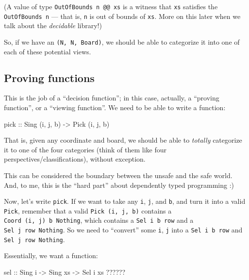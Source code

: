 \documentclass[]{article}
\newenvironment{Shaded}{}{}
\newcommand{\DataTypeTok}[1]{\textcolor[rgb]{0.56,0.13,0.00}{#1}}
\newcommand{\NormalTok}[1]{#1}
\newcommand{\OperatorTok}[1]{\textcolor[rgb]{0.40,0.40,0.40}{#1}}
\newcommand{\OtherTok}[1]{\textcolor[rgb]{0.00,0.44,0.13}{#1}}
\begin{document}
(A value of type \texttt{OutOfBounds\ n\ @@\ xs} is a witness that \texttt{xs}
satisfies the \texttt{OutOfBounds\ n} --- that is, \texttt{n} is out of bounds
of \texttt{xs}. More on this later when we talk about the \emph{decidable}
library!)

So, if we have an \texttt{(N,\ N,\ Board)}, we should be able to categorize it
into one of each of these potential views.

\hypertarget{proving-functions}{%
\subsection{Proving functions}\label{proving-functions}}

This is the job of a ``decision function''; in this case, actually, a ``proving
function'', or a ``viewing function''. We need to be able to write a function:

\begin{Shaded}
\begin{Highlighting}[]
\OtherTok{pick ::} \DataTypeTok{Sing}\NormalTok{ \textquotesingle{}(i, j, b)}
     \OtherTok{{-}>} \DataTypeTok{Pick}\NormalTok{ \textquotesingle{}(i, j, b)}
\end{Highlighting}
\end{Shaded}

That is, given any coordinate and board, we should be able to \emph{totally}
categorize it to one of the four categories (think of them like four
perspectives/classifications), without exception.

This can be considered the boundary between the unsafe and the safe world. And,
to me, this is the ``hard part'' about dependently typed programming :)

Now, let's write \texttt{pick}. If we want to take any \texttt{i}, \texttt{j},
and \texttt{b}, and turn it into a valid \texttt{Pick}, remember that a valid
\texttt{Pick\ \textquotesingle{}(i,\ j,\ b)} contains a
\texttt{Coord\ \textquotesingle{}(i,\ j)\ b\ \textquotesingle{}Nothing}, which
contains a \texttt{Sel\ i\ b\ row} and a
\texttt{Sel\ j\ row\ \textquotesingle{}Nothing}. So we need to ``convert'' some
\texttt{i}, \texttt{j} into a \texttt{Sel\ i\ b\ row} and
\texttt{Sel\ j\ row\ \textquotesingle{}Nothing}.

Essentially, we want a function:

\begin{Shaded}
\begin{Highlighting}[]
\OtherTok{sel ::} \DataTypeTok{Sing}\NormalTok{ i}
    \OtherTok{{-}>} \DataTypeTok{Sing}\NormalTok{ xs}
    \OtherTok{{-}>} \DataTypeTok{Sel}\NormalTok{ i xs }\OperatorTok{??????}
\end{Highlighting}
\end{Shaded}
\end{document}
